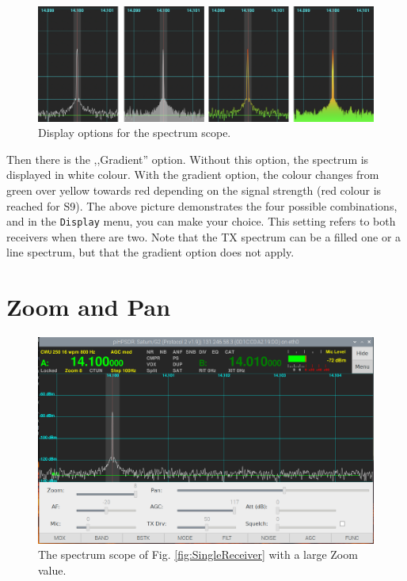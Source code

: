 \documentclass[12pt]{book}
\def\bltt#1{\texttt{\color{blue}#1}}
\begin{document}
\begin{figure}[h]
\center
\includegraphics[width=12cm]{ScopeFilling.png}
\caption{Display options for the spectrum scope.}
\end{figure}

Then there is the ,,Gradient'' option. Without this option, the
spectrum is displayed in white colour. With the gradient option,
the colour changes from green over yellow towards red depending
on the signal strength (red colour is reached for S9). The above
picture demonstrates the four possible combinations, and in
the \bltt{Display} menu, you can make your choice. This setting
refers to both receivers when there are two. Note that the TX
spectrum can be a filled one or a line spectrum, but that the
gradient option does not apply.

\section{Zoom and Pan}

\begin{figure}[h]
\center
\includegraphics[width=12cm]{ZoomPan.png}
\caption{The spectrum scope of Fig. \ref{fig:SingleReceiver} with a
large Zoom value.}
\end{figure}
\end{document}

